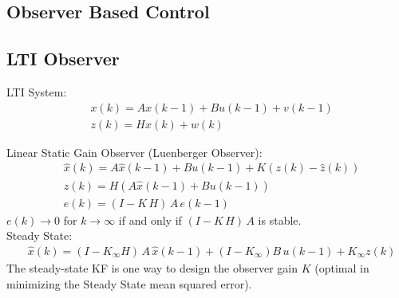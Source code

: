 \documentclass[landscape,a4paper,8pt]{scrartcl}
\begin{document}
\begin{multicols*}{3}
\columnbreak
\section{Observer Based Control}
\subsection{LTI Observer}
LTI System: 
\begin{align*}
& x(k) = A x(k-1) + B u (k-1) + v(k-1) \\
& z(k) = H x(k) + w(k)
\end{align*}

Linear Static Gain Observer (Luenberger Observer):
\begin{align*}
&\hat{x}(k) = A \hat{x}(k-1) + B u (k-1) + K(z(k) - \hat{z}(k)) \\
&\hat{z}(k) = H ( A \hat{x}(k-1) + B u(k-1)) \\
&e(k)= (I-K \, H)\, A \,  e(k-1)
\end{align*}
$e(k) \to 0$ for $k \to \infty$ if and only if $(I-K \, H)\, A$ is stable.\\

Steady State: 
\begin{align*}
&\hat{x}(k) = (I-K_\infty H )\, A\, \hat{x}(k-1) + (I-K_\infty) B \, u(k-1) + K_\infty z(k)
\end{align*}
The steady-state KF is one way to design the observer gain $K$ (optimal in minimizing the Steady State mean squared error). \\




%
%


\end{multicols*}
\end{document}
